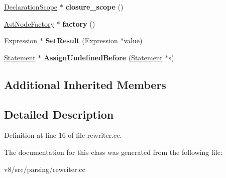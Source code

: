 \begin{DoxyCompactItemize}
\mbox{\hyperlink{classv8_1_1internal_1_1DeclarationScope}{Declaration\+Scope}} $\ast$ {\bfseries closure\+\_\+scope} ()
\item 
\mbox{\label{classv8_1_1internal_1_1Processor_af642af827c6cc75d6d466e1e2a27d25c}} 
\mbox{\hyperlink{classv8_1_1internal_1_1AstNodeFactory}{Ast\+Node\+Factory}} $\ast$ {\bfseries factory} ()
\item 
\mbox{\label{classv8_1_1internal_1_1Processor_a50365754de1be5320dc3bfd29e4ca004}} 
\mbox{\hyperlink{classv8_1_1internal_1_1Expression}{Expression}} $\ast$ {\bfseries Set\+Result} (\mbox{\hyperlink{classv8_1_1internal_1_1Expression}{Expression}} $\ast$value)
\item 
\mbox{\label{classv8_1_1internal_1_1Processor_a7c4589695dcd10e2bc35cf10970db8cd}} 
\mbox{\hyperlink{classv8_1_1internal_1_1Statement}{Statement}} $\ast$ {\bfseries Assign\+Undefined\+Before} (\mbox{\hyperlink{classv8_1_1internal_1_1Statement}{Statement}} $\ast$s)
\end{DoxyCompactItemize}
\subsection*{Additional Inherited Members}


\subsection{Detailed Description}


Definition at line 16 of file rewriter.\+cc.



The documentation for this class was generated from the following file\+:\begin{DoxyCompactItemize}
\item 
v8/src/parsing/rewriter.\+cc\end{DoxyCompactItemize}
